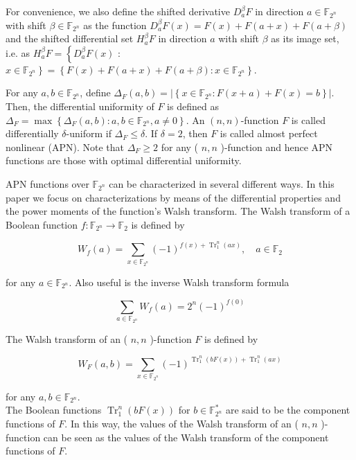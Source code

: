 \documentclass[10pt]{article}
\begin{document}
For convenience, we also define the shifted derivative $D_{a}^{\beta} F$ in direction $a \in \mathbb{F}_{2^{n}}$ with shift $\beta \in \mathbb{F}_{2^{n}}$ as the function $D_{a}^{\beta} F(x)=F(x)+F(a+x)+F(a+\beta)$ and the shifted differential set $H_{a}^{\beta} F$ in direction $a$ with shift $\beta$ as its image set, i.e. as $H_{a}^{\beta} F=\left\{D_{a}^{\beta} F(x)\right.$ : $\left.x \in \mathbb{F}_{2^{n}}\right\}=\left\{F(x)+F(a+x)+F(a+\beta): x \in \mathbb{F}_{2^{n}}\right\}$.

For any $a, b \in \mathbb{F}_{2^{n}}$, define $\Delta_{F}(a, b)=\left|\left\{x \in \mathbb{F}_{2^{n}}: F(x+a)+F(x)=b\right\}\right|$. Then, the differential uniformity of $F$ is defined as $\Delta_{F}=\max \left\{\Delta_{F}(a, b): a, b \in \mathbb{F}_{2^{n}}, a \neq 0\right\}$. An $(n, n)$-function $F$ is called differentially $\delta$-uniform if $\Delta_{F} \leq \delta$. If $\delta=2$, then $F$ is called almost perfect nonlinear (APN). Note that $\Delta_{F} \geq 2$ for any ( $n, n$ )-function and hence APN functions are those with optimal differential uniformity.

APN functions over $\mathbb{F}_{2^{n}}$ can be characterized in several different ways. In this paper we focus on characterizations by means of the differential properties and the power moments of the function's Walsh transform. The Walsh transform of a Boolean function $f: \mathbb{F}_{2^{n}} \rightarrow \mathbb{F}_{2}$ is defined by

$$
W_{f}(a)=\sum_{x \in \mathbb{F}_{2^{n}}}(-1)^{f(x)+\operatorname{Tr}_{1}^{n}(a x)}, \quad a \in \mathbb{F}_{2}
$$

for any $a \in \mathbb{F}_{2^{n}}$. Also useful is the inverse Walsh transform formula


\begin{equation*}
\sum_{a \in \mathbb{F}_{2^{n}}} W_{f}(a)=2^{n}(-1)^{f(0)} \tag{1}
\end{equation*}


The Walsh transform of an ( $n, n$ )-function $F$ is defined by


\begin{equation*}
W_{F}(a, b)=\sum_{x \in \mathbb{F}_{2^{n}}}(-1)^{\operatorname{Tr}_{1}^{n}(b F(x))+\operatorname{Tr}_{1}^{n}(a x)} \tag{2}
\end{equation*}


for any $a, b \in \mathbb{F}_{2^{n}}$.\\
The Boolean functions $\operatorname{Tr}_{1}^{n}(b F(x))$ for $b \in \mathbb{F}_{2^{n}}^{*}$ are said to be the component functions of $F$. In this way, the values of the Walsh transform of an ( $n, n$ )-function can be seen as the values of the Walsh transform of the component functions of $F$.
\end{document}
